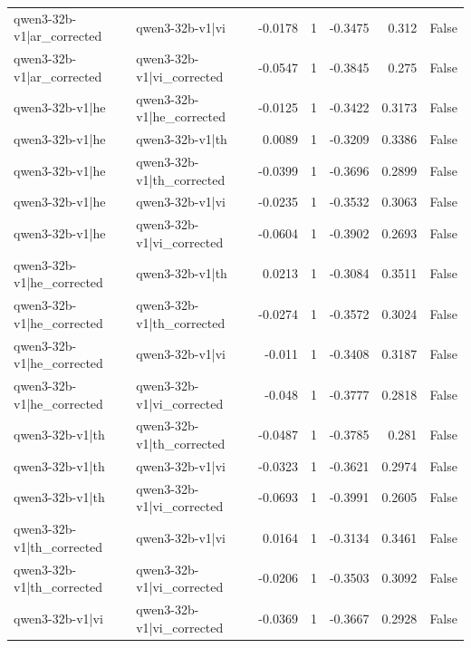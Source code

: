 \begin{table}
\begin{tabular}{l l r r r r l}
qwen3-32b-v1|ar_corrected & qwen3-32b-v1|vi & -0.0178 & 1 & -0.3475 & 0.312 & False \\
qwen3-32b-v1|ar_corrected & qwen3-32b-v1|vi_corrected & -0.0547 & 1 & -0.3845 & 0.275 & False \\
qwen3-32b-v1|he & qwen3-32b-v1|he_corrected & -0.0125 & 1 & -0.3422 & 0.3173 & False \\
qwen3-32b-v1|he & qwen3-32b-v1|th & 0.0089 & 1 & -0.3209 & 0.3386 & False \\
qwen3-32b-v1|he & qwen3-32b-v1|th_corrected & -0.0399 & 1 & -0.3696 & 0.2899 & False \\
qwen3-32b-v1|he & qwen3-32b-v1|vi & -0.0235 & 1 & -0.3532 & 0.3063 & False \\
qwen3-32b-v1|he & qwen3-32b-v1|vi_corrected & -0.0604 & 1 & -0.3902 & 0.2693 & False \\
qwen3-32b-v1|he_corrected & qwen3-32b-v1|th & 0.0213 & 1 & -0.3084 & 0.3511 & False \\
qwen3-32b-v1|he_corrected & qwen3-32b-v1|th_corrected & -0.0274 & 1 & -0.3572 & 0.3024 & False \\
qwen3-32b-v1|he_corrected & qwen3-32b-v1|vi & -0.011 & 1 & -0.3408 & 0.3187 & False \\
qwen3-32b-v1|he_corrected & qwen3-32b-v1|vi_corrected & -0.048 & 1 & -0.3777 & 0.2818 & False \\
qwen3-32b-v1|th & qwen3-32b-v1|th_corrected & -0.0487 & 1 & -0.3785 & 0.281 & False \\
qwen3-32b-v1|th & qwen3-32b-v1|vi & -0.0323 & 1 & -0.3621 & 0.2974 & False \\
qwen3-32b-v1|th & qwen3-32b-v1|vi_corrected & -0.0693 & 1 & -0.3991 & 0.2605 & False \\
qwen3-32b-v1|th_corrected & qwen3-32b-v1|vi & 0.0164 & 1 & -0.3134 & 0.3461 & False \\
qwen3-32b-v1|th_corrected & qwen3-32b-v1|vi_corrected & -0.0206 & 1 & -0.3503 & 0.3092 & False \\
qwen3-32b-v1|vi & qwen3-32b-v1|vi_corrected & -0.0369 & 1 & -0.3667 & 0.2928 & False \\
\bottomrule
\end{tabular}
\end{table}
